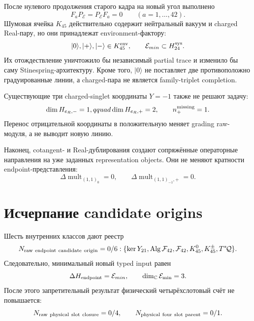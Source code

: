 После нулевого продолжения старого кадра на новый угол выполнено
\begin{equation}
 F_aP_{\mathcal E}=P_{\mathcal E}F_a=0
 \qquad(a=1,\ldots,42).
 \label{eq:v9-endpoint-old-frame-zero-extension}
\end{equation}
Шумовая ячейка $K_{45}$ действительно содержит нейтральный вакуум и
charged Real-пару, но они принадлежат environment-фактору:
\begin{equation}
 |0\rangle,|+\rangle,|-\rangle\in K_{45}^{\rm env},
 \qquad
 \mathcal E_{min}\subset H_{24}^{\rm sys}.
 \label{eq:v9-endpoint-tensor-factor-mismatch}
\end{equation}
Их отождествление уничтожило бы независимый partial trace и изменило бы
саму Stinespring-архитектуру. Кроме того, $|0\rangle$ не поставляет две
противоположно градуированные линии, а charged-пара не является
family-triplet completion.

Существующие три charged-singlet координаты $Y=-1$ также не решают задачу:
\begin{equation}
 \dim H_{e_R,-}=1,qquad \dim H_{e_R,+}=2,
 \qquad n_+^{\rm missing}=1.
 \label{eq:v9-endpoint-charged-grading-defect}
\end{equation}
Перенос отрицательной координаты в положительную меняет grading raw-модуля,
а не выводит новую линию.

Наконец, cotangent- и Real-дублирования создают сопряжённые операторные
направления на уже заданных representation objects. Они не меняют
кратности endpoint-представления:
\begin{equation}
 \Delta\operatorname{mult}_{(1,1)_0}=0,
 \qquad
 \Delta\operatorname{mult}_{(1,1)_{-1},+}=0.
 \label{eq:v9-endpoint-doubling-multiplicity}
\end{equation}

\section{Исчерпание candidate origins}

Шесть внутренних классов дают реестр
\begin{equation}
 N_{\rm raw\ endpoint\ candidate\ origin}=0/6:
 \{\ker Y_{21},\operatorname{Alg}\mathcal F_{42},\mathcal F_{42},
 K_{45}^{0},K_{45}^{\pm},T^*\!\mathcal Q\}.
 \label{eq:v9-endpoint-candidate-ledger}
\end{equation}
Следовательно, минимальный новый typed input равен
\begin{equation}
 \Delta H_{\rm endpoint}=\mathcal E_{min},
 \qquad \dim_{\mathbb C}\mathcal E_{\min}=3.
 \label{eq:v9-endpoint-minimal-new-data}
\end{equation}
После этого запретительный результат физический четырёхслотовый счёт не повышается:
\begin{equation}
 N_{\rm raw\ physical\ slot\ closure}=0/4,
 \qquad N_{\rm physical\ four\ slot\ parent}=0/1.
 \label{eq:v9-endpoint-raw-ledger}
\end{equation}


